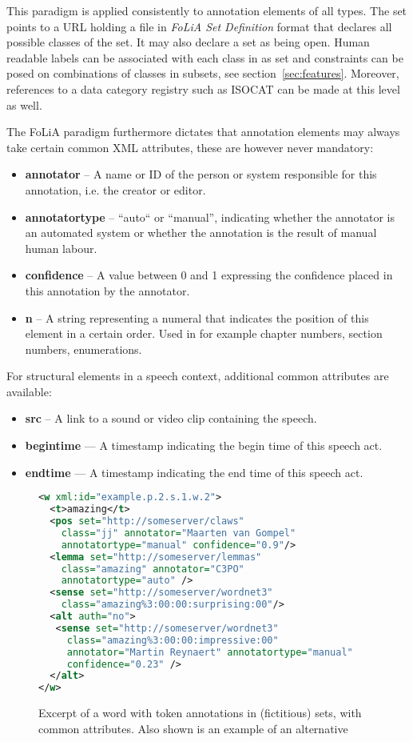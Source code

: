 \documentclass[a4paper,10pt,twoside]{article}
\begin{document}
This paradigm is applied consistently to annotation elements of all types. The
set points to a URL holding a file in \emph{FoLiA Set Definition} format that
declares all possible classes of the set. It may also declare a set as being
open. Human readable labels can be associated with each class in as set and
constraints can be posed on combinations of classes in subsets, see
section~\ref{sec:features}. Moreover, references to a data category registry
such as ISOCAT \cite{ISOCAT} can be made at this level as well.

The FoLiA paradigm furthermore dictates that annotation elements may always take certain
common XML attributes, these are however never mandatory:

\begin{itemize}
\item \textbf{annotator} -- A name or ID of the person or system responsible for this annotation, i.e. the creator or editor.
\item \textbf{annotatortype} -- ``auto`` or ``manual'', indicating whether the annotator is an automated system or whether the annotation is the result of manual human labour.
\item \textbf{confidence} -- A value between 0 and 1 expressing the confidence placed in this annotation by the annotator.
\item \textbf{n} -- A string representing a numeral that indicates the position of this element in a certain order. Used in for example chapter numbers, section numbers, enumerations.
\end{itemize}

For structural elements in a speech context, additional common attributes are
available:

\begin{itemize}
  \item \textbf{src} -- A link to a sound or video clip containing the speech.
  \item \textbf{begintime} --- A timestamp indicating the begin time of this speech act.
  \item \textbf{endtime} --- A timestamp indicating the end time of this speech act.
\end{itemize}

\begin{figure}[tbh]

\label{fig:wordannotation}
\begin{lstlisting}[language=xml]
<w xml:id="example.p.2.s.1.w.2">
  <t>amazing</t>
  <pos set="http://someserver/claws" 
    class="jj" annotator="Maarten van Gompel"
    annotatortype="manual" confidence="0.9"/>
  <lemma set="http://someserver/lemmas"
    class="amazing" annotator="C3PO" 
    annotatortype="auto" />
  <sense set="http://someserver/wordnet3"
    class="amazing%3:00:00:surprising:00"/>
  <alt auth="no">
   <sense set="http://someserver/wordnet3"
     class="amazing%3:00:00:impressive:00"
     annotator="Martin Reynaert" annotatortype="manual"
     confidence="0.23" />
  </alt>
</w> 
\end{lstlisting}
\caption{Excerpt of a word with token annotations in (fictitious) sets, with common attributes. Also shown is an example of an alternative} 
\end{figure}
\end{document}
